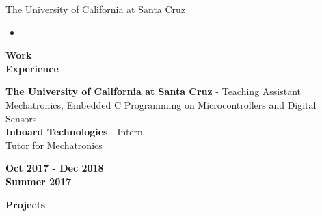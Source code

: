 \documentclass[paper=a4,fontsize=11pt]{article} %
\def \sectionSpace      {0.5cm}     %
\def \leftColSpace      {0.12}      %
\def \middleColSpace    {0.675}     %
\def \bigMiddleColSpace {0.875}     %
\def \rightColSpace     {0.25}      %
\begin{document}
\noindent
\begin{minipage}[t]{\leftColSpace\linewidth}
    \hfill
\end{minipage}
\begin{minipage}[t]{\bigMiddleColSpace\linewidth}
    \noindent The University of California at Santa Cruz
    \begin{itemize}[noitemsep,topsep=0pt]
        \item 
    \end{itemize}
\end{minipage}


\vspace{\sectionSpace}
\noindent
\begin{minipage}[t]{\leftColSpace\linewidth}
\begin{flushleft}
\noindent \textbf{Work\\Experience}\\
\end{flushleft}
\end{minipage}
\begin{minipage}[t]{\middleColSpace\linewidth}
\begin{flushleft}
\noindent \textbf{The University of California at Santa Cruz} - Teaching Assistant\\
\noindent Mechatronics, Embedded C Programming on Microcontrollers and Digital Sensors\\
\noindent \textbf{Inboard Technologies} - Intern \hfill \\
\noindent Tutor for Mechatronics\\
\end{flushleft}
\end{minipage}
\begin{minipage}[t]{\rightColSpace\linewidth}
\begin{flushleft}
\noindent \textbf{Oct 2017 - Dec 2018}
\\[2\baselineskip]
\noindent \textbf{Summer 2017}
\end{flushleft}
\end{minipage}

\vspace{\sectionSpace}
\noindent
\begin{minipage}[t]{\leftColSpace\linewidth}
\begin{flushleft}
\noindent \textbf{Projects}\\
\end{flushleft}
\end{minipage}
\begin{minipage}[t]{\middleColSpace\linewidth}
\begin{flushleft}
%
\end{flushleft}
\end{minipage}
\end{document}
